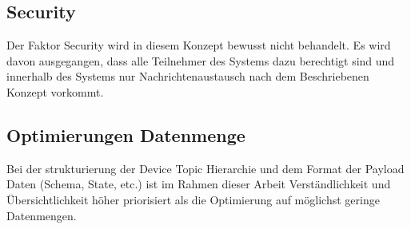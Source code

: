 \subsection{Security}
Der Faktor Security wird in diesem Konzept bewusst nicht behandelt. Es wird davon ausgegangen, dass alle Teilnehmer des Systems dazu berechtigt sind und innerhalb des Systems nur Nachrichtenaustausch nach dem Beschriebenen Konzept vorkommt.

\subsection{Optimierungen Datenmenge}
Bei der strukturierung der Device Topic Hierarchie und dem Format der Payload Daten (Schema, State, etc.) ist im Rahmen dieser Arbeit Verständlichkeit und Übersichtlichkeit höher priorisiert als die Optimierung auf möglichst geringe Datenmengen.